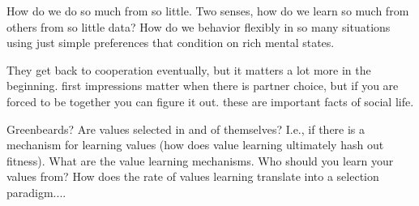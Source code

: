 \documentclass[doc, natbib]{apa6}
\theoremstyle{definition}
\begin{document}
How do we do so much from so little. Two senses, how do we learn so much from others from so little data? How do we behavior flexibly in so many situations using just simple preferences that condition on rich mental states. 

They get back to cooperation eventually, but it matters a lot more in the beginning. first impressions matter when there is partner choice, but if you are forced to be together you can figure it out. these are important facts of social life. 


Greenbeards? Are values selected in and of themselves? I.e., if there is a mechanism for learning values (how does value learning ultimately hash out fitness). What are the value learning mechanisms. Who should you learn your values from? How does the rate of values learning translate into a selection paradigm....







\end{document}
